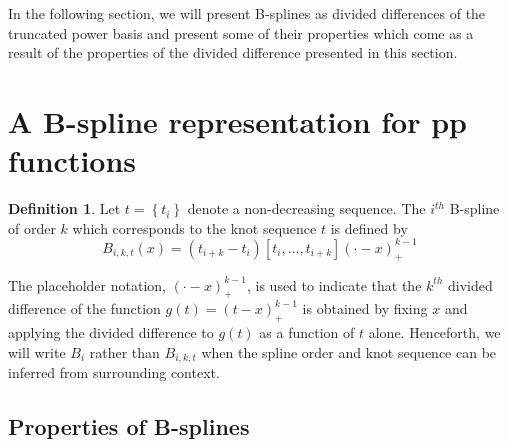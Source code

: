 \documentclass[12pt]{article}
\theoremstyle{definition}
\newtheorem{definition}{Definition}[section]
\begin{document}

In the following section, we will present B-splines as divided differences of the truncated power basis and present some of their properties which come as a result of the properties of the divided difference presented in this section.

\section{A B-spline representation for pp functions}

\begin{definition} \label{definition:order_k_Bspline}
Let $t= \left\{ t_i \right\}$ denote a non-decreasing sequence. The $i^{th}$ B-spline of order $k$ which corresponds to the knot sequence $t$ is defined by 
\begin{equation} \label{eq:bspline_definition}
B_{i,k,t}\left(x\right) = \left(t_{i+k}-t_i\right)\left[t_i,\dots,t_{i+k}\right]\left(\cdot -x\right)_+^{k-1}
\end{equation}
\end{definition}

The placeholder notation, $\left(\cdot - x\right)_+^{k-1}$, is used to indicate that the $k^{th}$ divided difference of the function $g\left(t \right) = \left(t-x\right)^{k-1}_+$ is obtained by fixing $x$ and applying the divided difference to $g\left(t \right)$ as a function of $t$ alone. Henceforth, we will write $B_i$ rather than $B_{i,k,t}$ when the spline order and knot sequence can be inferred from surrounding context.

\subsection{Properties of B-splines}
\end{document}
